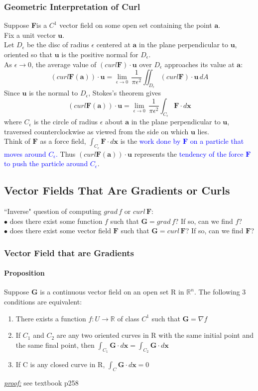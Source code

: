 \documentclass[11pt]{article}
\newcommand{\tb}[1]{\textbf{#1}}
\newcommand{\real}[0]{\mathbb{R}}
\newcommand{\proof}[0]{\textit{\underline{proof:} }}
\newcommand{\vx}[0]{\tb{x}}
\newcommand{\va}[0]{\tb{a}}
\newcommand{\vf}[0]{\tb{F}}
\newcommand{\vg}[0]{\tb{G}}
\newcommand{\vu}[0]{\tb{u}}
\begin{document}
\subsubsection{Geometric Interpretation of Curl}
Suppose \vf is a $C^1$ vector field on some open set containing the point $\va$.\\
Fix a unit vector $\vu$. \\
Let $D_\epsilon$ be the disc of radius $\epsilon$ centered at $\va$ in the plane perpendicular to $\vu$, oriented so that $\vu$ is the positive normal for $D_\epsilon$.\\
As $\epsilon \rightarrow 0$, the average value of $(curl \vf) \cdot \vu$ over $D_\epsilon$ approaches its value at $\va$:
$$(curl \vf ( \va ) ) \cdot \vu = \underset{\epsilon \rightarrow 0}{\lim} \,\frac{1}{\pi \epsilon^2} \iint_{D_\epsilon} (curl\vf) \cdot \vu \,dA$$
Since $\vu$ is the normal to $D_\epsilon$, Stokes's theorem gives
$$(curl \vf(\va))\cdot \vu = \underset{\epsilon \rightarrow 0}{\lim} \,\frac{1}{\pi \epsilon^2} \int_{C_\epsilon}\vf\cdot d\vx$$ where $C_\epsilon$ is the circle of radius $\epsilon$ about $\va$ in the plane perpendicular to $\vu$, traversed counterclockwise as viewed from the side on which $\vu$ lies. \\
Think of $\vf$ as a force field, $\int_{C_\epsilon}\vf\cdot d\vx$ is the \textcolor{blue}{work done by $\vf$ on a particle that moves around $C_\epsilon$.} Thus $(curl \vf(\va))\cdot \vu$ represents the \textcolor{blue}{tendency of the force $\vf$ to push the particle around $C_\epsilon$}.
\subsection{Vector Fields That Are Gradients or Curls}
``Inverse" question of computing $grad \,f$ or $curl \,\vf$:\\
$\bullet$ does there exist some function $f$ such that $\vg = grad \, f$? If so, can we find $f$? \\
$\bullet$ does there exist some vector field $\vf$ such that $\vg = curl \, \vf$? If so, can we find $\vf$?
\subsubsection{Vector Field that are Gradients}
\paragraph{Proposition} Suppose \tb{G} is a continuous vector field on an open set R in $\real^n$. The following 3 conditions are equivalent:
\begin{enumerate}
	\item There exists a function $f: U \rightarrow \real$ of class $C^1$ such that $\vg = \nabla f$
	\item If $C_1$ and $C_2$ are any two oriented curves in R with the same initial point and the same final point, then $\int_{C_1} \vg \cdot d\vx = \int_{C_2}\vg\cdot d\vx$
	\item If C is any closed curve in R, $\int_C \vg \cdot d\vx = 0$
\end{enumerate}
\proof see textbook p258
\end{document}
